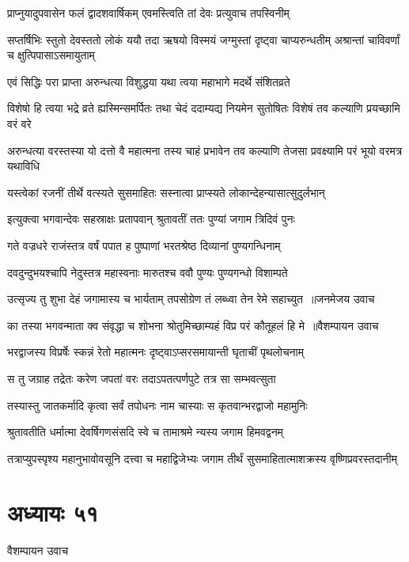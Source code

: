 \twolineshloka
{प्राप्नुयादुपवासेन फलं द्वादशवार्षिकम्}
{एवमस्त्विति तां देवः प्रत्युवाच तपस्विनीम्}


\threelineshloka
{सप्तर्षिभिः स्तुतो देवस्ततो लोकं ययौ तदा}
{ऋषयो विस्मयं जग्मुस्तां दृष्ट्वा चाप्यरुन्धतीम्}
{अश्रान्तां चाविवर्णां च क्षुत्पिपासाऽसमायुताम्}


\twolineshloka
{एवं सिद्धिः परा प्राप्ता अरुन्धत्या विशुद्धया}
{यथा त्वया महाभागे मदर्थे संशितव्रते}


\threelineshloka
{विशेषो हि त्वया भद्रे व्रते ह्यस्मिन्समर्पितः}
{तथा चेदं ददाम्यद्य नियमेन सुतोषितः}
{विशेषं तव कल्याणि प्रयच्छामि वरं वरे}


\threelineshloka
{अरुन्धत्या वरस्तस्या यो दत्तो वै महात्मना}
{तस्य चाहं प्रभावेन तव कल्याणि तेजसा}
{प्रवक्ष्यामि परं भूयो वरमत्र यथाविधि}


\twolineshloka
{यस्त्वेकां रजनीं तीर्थे वत्स्यते सुसमाहितः}
{सस्नात्वा प्राप्स्यते लोकान्देहन्यासात्सुदुर्लभान्}


\twolineshloka
{इत्युक्त्वा भगवान्देवः सहस्राक्षः प्रतापवान्}
{श्रुतावतीं ततः पुण्यां जगाम त्रिदिवं पुनः}


\twolineshloka
{गते वज्रधरे राजंस्तत्र वर्षं पपात ह}
{पुष्पाणां भरतश्रेष्ठ दिव्यानां पुण्यगन्धिनाम्}


\twolineshloka
{दवदुन्दुभयश्चापि नेदुस्तत्र महास्वनाः}
{मारुतश्च ववौ पुण्यः पुण्यगन्धो विशाम्पते}


\threelineshloka
{उत्सृज्य तु शुभा देहं जगामास्य च भार्यताम्}
{तपसोग्रेण तं लब्ध्वा तेन रेमे सहाच्युत ॥जनमेजय उवाच}
{}


\threelineshloka
{का तस्या भगवन्माता क्व संवृद्धा च शोभना}
{श्रोतुमिच्छाम्यहं विप्र परं कौतूहलं हि मे ॥वैशम्पायन उवाच}
{}


\twolineshloka
{भरद्वाजस्य विप्रर्षेः स्कन्नं रेतो महात्मनः}
{दृष्ट्वाऽप्सरसमायान्ती घृताचीं पृथलोचनाम्}


\twolineshloka
{स तु जग्राह तद्रेतः करेण जपतां वरः}
{तदाऽपतत्पर्णपुटे तत्र सा सम्भवत्सुता}


\twolineshloka
{तस्यास्तु जातकर्मादि कृत्वा सर्वं तपोधनः}
{नाम चास्याः स कृतवान्भरद्वाजो महामुनिः}


\twolineshloka
{श्रुतावतीति धर्मात्मा देवर्षिगणसंसदि}
{स्वे च तामाश्रमे न्यस्य जगाम हिमवद्वनम्}


\twolineshloka
{तत्राप्युपस्पृश्य महानुभावोवसूनि दत्त्वा च महाद्विजेभ्यः}
{जगाम तीर्थं सुसमाहितात्माशक्रस्य वृष्णिप्रवरस्तदानीम्}


\chapter{अध्यायः ५१}
\twolineshloka
{वैशम्पायन उवाच}
{}



